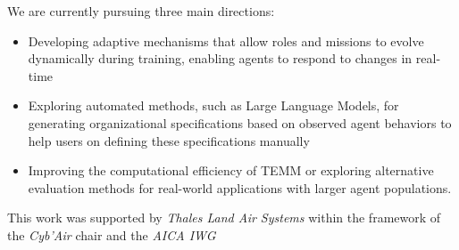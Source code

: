 \documentclass[sigconf]{aamas}
\begin{document}
We are currently pursuing three main directions:
%
\begin{itemize}
  \item Developing adaptive mechanisms that allow roles and missions to evolve dynamically during training, enabling agents to respond to changes in real-time
  \item Exploring automated methods, such as Large Language Models, for generating organizational specifications based on observed agent behaviors to help users on defining these specifications manually
  \item Improving the computational efficiency of TEMM or exploring alternative evaluation methods for real-world applications with larger agent populations.
\end{itemize}

\begin{acks}
  This work was supported by \emph{Thales Land Air Systems} within the framework of the \emph{Cyb'Air} chair and the \emph{AICA IWG}
\end{acks}




\balance


\end{document}
